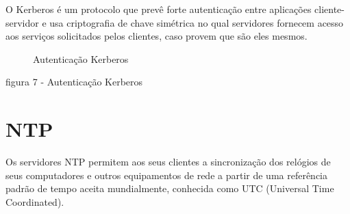 O Kerberos é um protocolo que prevê forte autenticação entre aplicações cliente-servidor e usa criptografia de chave simétrica no qual servidores fornecem acesso aos serviços solicitados pelos clientes, caso provem que são eles mesmos. \cite{FILHO}


 
\begin{figure}[ht]
   	\centering
   	\caption{Autenticação Kerberos \cite{KERBEROS}}
    \label{kerberos}
\end{figure}
figura 7 - Autenticação Kerberos \cite{KERBEROS}

\section{NTP}

Os servidores NTP permitem aos seus clientes a sincronização dos relógios de seus computadores e outros equipamentos de rede a partir de uma referência padrão de tempo aceita mundialmente, conhecida como UTC (Universal Time Coordinated).\cite{RNP}

